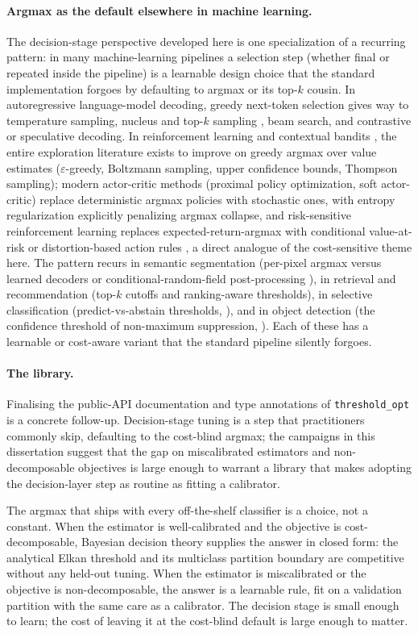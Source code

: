 \paragraph{Argmax as the default elsewhere in machine learning.} The decision-stage perspective developed here is one specialization of a recurring pattern: in many machine-learning pipelines a selection step (whether final or repeated inside the pipeline) is a learnable design choice that the standard implementation forgoes by defaulting to argmax or its top-$k$ cousin. In autoregressive language-model decoding, greedy next-token selection gives way to temperature sampling, nucleus and top-$k$ sampling \citep{holtzman2020curious}, beam search, and contrastive or speculative decoding. In reinforcement learning and contextual bandits \citep{sutton2018reinforcement}, the entire exploration literature exists to improve on greedy argmax over value estimates ($\varepsilon$-greedy, Boltzmann sampling, upper confidence bounds, Thompson sampling); modern actor-critic methods (proximal policy optimization, soft actor-critic) replace deterministic argmax policies with stochastic ones, with entropy regularization explicitly penalizing argmax collapse, and risk-sensitive reinforcement learning replaces expected-return-argmax with conditional value-at-risk or distortion-based action rules \citep{tamar2015cvar}, a direct analogue of the cost-sensitive theme here. The pattern recurs in semantic segmentation (per-pixel argmax versus learned decoders or conditional-random-field post-processing \citep{krahenbuhl2011efficient}), in retrieval and recommendation (top-$k$ cutoffs and ranking-aware thresholds), in selective classification (predict-vs-abstain thresholds, \citealp{geifman2017selective}), and in object detection (the confidence threshold of non-maximum suppression, \citealp{bodla2017soft}). Each of these has a learnable or cost-aware variant that the standard pipeline silently forgoes.

\paragraph{The library.} Finalising the public-API documentation and type annotations of \texttt{threshold\_opt} is a concrete follow-up. Decision-stage tuning is a step that practitioners commonly skip, defaulting to the cost-blind argmax; the campaigns in this dissertation suggest that the gap on miscalibrated estimators and non-decomposable objectives is large enough to warrant a library that makes adopting the decision-layer step as routine as fitting a calibrator.

The argmax that ships with every off-the-shelf classifier is a choice, not a constant. When the estimator is well-calibrated and the objective is cost-decomposable, Bayesian decision theory supplies the answer in closed form: the analytical Elkan threshold and its multiclass partition boundary are competitive without any held-out tuning. When the estimator is miscalibrated or the objective is non-decomposable, the answer is a learnable rule, fit on a validation partition with the same care as a calibrator. The decision stage is small enough to learn; the cost of leaving it at the cost-blind default is large enough to matter.
